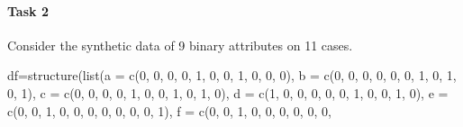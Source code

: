 \documentclass[
]{book}
\newenvironment{Shaded}{\begin{snugshade}}{\end{snugshade}}
\newcommand{\AttributeTok}[1]{\textcolor[rgb]{0.77,0.63,0.00}{#1}}
\newcommand{\DecValTok}[1]{\textcolor[rgb]{0.00,0.00,0.81}{#1}}
\newcommand{\FunctionTok}[1]{\textcolor[rgb]{0.00,0.00,0.00}{#1}}
\newcommand{\NormalTok}[1]{#1}
\newcommand{\OtherTok}[1]{\textcolor[rgb]{0.56,0.35,0.01}{#1}}
\theoremstyle{definition}
\theoremstyle{definition}
\theoremstyle{definition}
\theoremstyle{definition}
\theoremstyle{remark}
\begin{document}
\hypertarget{task-2-1}{%
\paragraph*{Task 2}\label{task-2-1}}

Consider the synthetic data of 9 binary attributes on 11 cases.

\begin{Shaded}
\begin{Highlighting}[]
\NormalTok{df}\OtherTok{=}\FunctionTok{structure}\NormalTok{(}\FunctionTok{list}\NormalTok{(}\AttributeTok{a =} \FunctionTok{c}\NormalTok{(}\DecValTok{0}\NormalTok{, }\DecValTok{0}\NormalTok{, }\DecValTok{0}\NormalTok{, }\DecValTok{0}\NormalTok{, }\DecValTok{1}\NormalTok{, }\DecValTok{0}\NormalTok{, }\DecValTok{0}\NormalTok{, }\DecValTok{1}\NormalTok{, }\DecValTok{0}\NormalTok{, }\DecValTok{0}\NormalTok{, }\DecValTok{0}\NormalTok{), }\AttributeTok{b =} \FunctionTok{c}\NormalTok{(}\DecValTok{0}\NormalTok{, }
\DecValTok{0}\NormalTok{, }\DecValTok{0}\NormalTok{, }\DecValTok{0}\NormalTok{, }\DecValTok{0}\NormalTok{, }\DecValTok{0}\NormalTok{, }\DecValTok{1}\NormalTok{, }\DecValTok{0}\NormalTok{, }\DecValTok{1}\NormalTok{, }\DecValTok{0}\NormalTok{, }\DecValTok{1}\NormalTok{), }\AttributeTok{c =} \FunctionTok{c}\NormalTok{(}\DecValTok{0}\NormalTok{, }\DecValTok{0}\NormalTok{, }\DecValTok{0}\NormalTok{, }\DecValTok{0}\NormalTok{, }\DecValTok{1}\NormalTok{, }\DecValTok{0}\NormalTok{, }\DecValTok{0}\NormalTok{, }\DecValTok{1}\NormalTok{, }
\DecValTok{0}\NormalTok{, }\DecValTok{1}\NormalTok{, }\DecValTok{0}\NormalTok{), }\AttributeTok{d =} \FunctionTok{c}\NormalTok{(}\DecValTok{1}\NormalTok{, }\DecValTok{0}\NormalTok{, }\DecValTok{0}\NormalTok{, }\DecValTok{0}\NormalTok{, }\DecValTok{0}\NormalTok{, }\DecValTok{0}\NormalTok{, }\DecValTok{1}\NormalTok{, }\DecValTok{0}\NormalTok{, }\DecValTok{0}\NormalTok{, }\DecValTok{1}\NormalTok{, }\DecValTok{0}\NormalTok{), }\AttributeTok{e =} \FunctionTok{c}\NormalTok{(}\DecValTok{0}\NormalTok{, }\DecValTok{0}\NormalTok{, }
\DecValTok{1}\NormalTok{, }\DecValTok{0}\NormalTok{, }\DecValTok{0}\NormalTok{, }\DecValTok{0}\NormalTok{, }\DecValTok{0}\NormalTok{, }\DecValTok{0}\NormalTok{, }\DecValTok{0}\NormalTok{, }\DecValTok{0}\NormalTok{, }\DecValTok{1}\NormalTok{), }\AttributeTok{f =} \FunctionTok{c}\NormalTok{(}\DecValTok{0}\NormalTok{, }\DecValTok{0}\NormalTok{, }\DecValTok{1}\NormalTok{, }\DecValTok{0}\NormalTok{, }\DecValTok{0}\NormalTok{, }\DecValTok{0}\NormalTok{, }\DecValTok{0}\NormalTok{, }\DecValTok{0}\NormalTok{, }\DecValTok{0}\NormalTok{, }

\end{Highlighting}
\end{Shaded}
\end{document}
